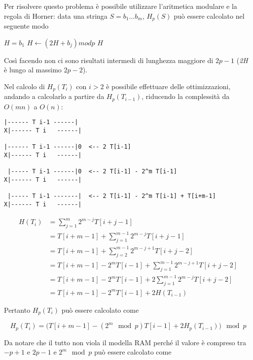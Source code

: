 Per risolvere questo problema è possibile utilizzare l'aritmetica
modulare e la regola di Horner: data una stringa $S = b_1 \ldots b_m$, $H_p(S)$ può essere calcolato nel seguente modo

\begin{breakablealgorithm}
	\begin{algorithmic}[1]
    \State $ H = b_1 $
        \State $H \gets (2H + b_j) mod p$
    \EndFor
    \State \Return $H$
\EndFunction
\end{algorithmic}
\end{breakablealgorithm}


Così facendo non ci sono risultati intermedi di lunghezza maggiore di
$2p-1$ (\emph{2H} è lungo al massimo $2p-2$).

Nel calcolo di $H_p(T_i)$ con $i > 2$ è possibile effettuare delle ottimizzazioni, andando a calcolarlo a
partire da $H_p(T_{i-1})$, riducendo la complessità da
$O(mn)$ a $O(n)$:

\begin{verbatim}
|------ T i-1 ------|
X|------ T i   ------|

|------ T i-1 ------|0  <-- 2 T[i-1]
X|------ T i   ------|

 |----- T i-1 ------|0  <-- 2 T[i-1] - 2^m T[i-1]
X|------ T i   ------|

 |----- T i-1 -------|  <-- 2 T[i-1] - 2^m T[i-1] + T[i+m-1]
X|------ T i   ------| 
\end{verbatim}

\begin{align*}
	H(T_i) &= \sum\limits_{j=1}^m 2^{m-j} T[i+j -1] \\
	           &= T[i+m -1] + \sum\limits_{j=1}^{m-1} 2^{m-j} T[i+j -1] \\
	           &= T[i+m -1] + \sum\limits_{j=2}^{m-1} 2^{m-j+1} T[i+j -2] \\
	           &= T[i+m -1] - 2^m T[i-1] + \sum\limits_{j=1}^{m-1} 2^{m-j+1} T[i+j -2] \\
	           &= T[i+m -1] - 2^m T[i-1] + 2\sum\limits_{j=1}^{m-1} 2^{m-j} T[i+j -2] \\
	           &= T[i+m -1] - 2^m T[i-1] + 2H(T_{i-1})
\end{align*}

Pertanto $ H_p(T_i) $ può essere calcolato come

$$
H_p(T_i) = \big( T[i+m -1] - (2^m \mod p) T[i-1] + 2H_p(T_{i-1}) \big) \mod p
$$

Da notare che il tutto non viola il modella RAM perché il valore è compreso tra $ -p+1 $ e $ 2p-1 $ e $ 2^m \mod p $ può essere calcolato come


